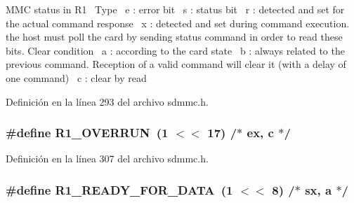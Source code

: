 M\+MC status in R1~\newline
 Type~\newline
 e \+: error bit~\newline
 s \+: status bit~\newline
 r \+: detected and set for the actual command response~\newline
 x \+: detected and set during command execution. the host must poll the card by sending status command in order to read these bits. Clear condition~\newline
 a \+: according to the card state~\newline
 b \+: always related to the previous command. Reception of a valid command will clear it (with a delay of one command)~\newline
 c \+: clear by read~\newline
 



Definición en la línea 293 del archivo sdmmc.\+h.

\subsubsection[{\texorpdfstring{R1\+\_\+\+O\+V\+E\+R\+R\+UN}{R1_OVERRUN}}]{\setlength{\rightskip}{0pt plus 5cm}\#define R1\+\_\+\+O\+V\+E\+R\+R\+UN~(1 $<$$<$ 17)	/$\ast$ ex, c $\ast$/}\hypertarget{group___c_h_i_p___s_d_m_m_c___definitions_ga340950dfbe00e230be6b24a94cc21ce3}{}\label{group___c_h_i_p___s_d_m_m_c___definitions_ga340950dfbe00e230be6b24a94cc21ce3}


Definición en la línea 307 del archivo sdmmc.\+h.

\subsubsection[{\texorpdfstring{R1\+\_\+\+R\+E\+A\+D\+Y\+\_\+\+F\+O\+R\+\_\+\+D\+A\+TA}{R1_READY_FOR_DATA}}]{\setlength{\rightskip}{0pt plus 5cm}\#define R1\+\_\+\+R\+E\+A\+D\+Y\+\_\+\+F\+O\+R\+\_\+\+D\+A\+TA~(1 $<$$<$ 8)	/$\ast$ sx, a $\ast$/}\hypertarget{group___c_h_i_p___s_d_m_m_c___definitions_ga1f5d0285e83c1856a126b9763904e652}{}\label{group___c_h_i_p___s_d_m_m_c___definitions_ga1f5d0285e83c1856a126b9763904e652}


